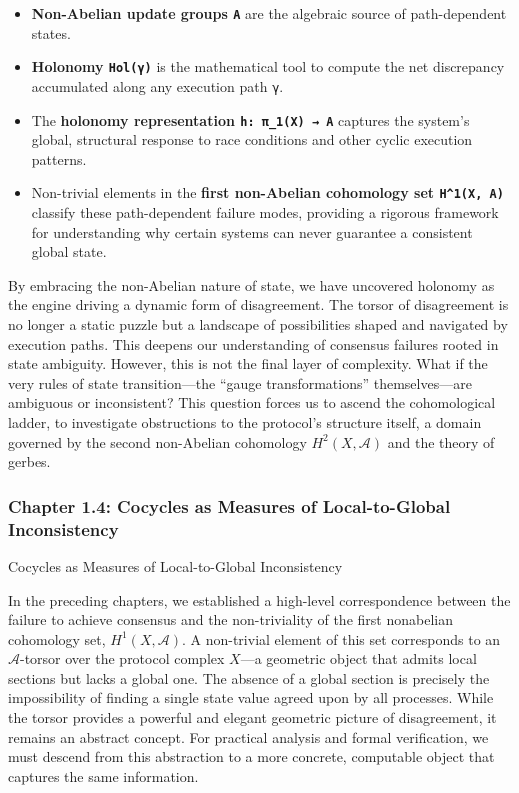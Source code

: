 \documentclass[
]{article}
\providecommand{\tightlist}{%
  \setlength{\itemsep}{0pt}\setlength{\parskip}{0pt}}
\begin{document}
\begin{itemize}
\tightlist
\item
  \textbf{Non-Abelian update groups \texttt{A}} are the algebraic source
  of path-dependent states.
\item
  \textbf{Holonomy \texttt{Hol(γ)}} is the mathematical tool to compute
  the net discrepancy accumulated along any execution path \texttt{γ}.
\item
  The \textbf{holonomy representation \texttt{h:\ π\_1(X)\ →\ A}}
  captures the system's global, structural response to race conditions
  and other cyclic execution patterns.
\item
  Non-trivial elements in the \textbf{first non-Abelian cohomology set
  \texttt{H\^{}1(X,\ A)}} classify these path-dependent failure modes,
  providing a rigorous framework for understanding why certain systems
  can never guarantee a consistent global state.
\end{itemize}

By embracing the non-Abelian nature of state, we have uncovered holonomy
as the engine driving a dynamic form of disagreement. The torsor of
disagreement is no longer a static puzzle but a landscape of
possibilities shaped and navigated by execution paths. This deepens our
understanding of consensus failures rooted in state ambiguity. However,
this is not the final layer of complexity. What if the very rules of
state transition---the ``gauge transformations'' themselves---are
ambiguous or inconsistent? This question forces us to ascend the
cohomological ladder, to investigate obstructions to the protocol's
structure itself, a domain governed by the second non-Abelian cohomology
\(H^2(X, \mathcal{A})\) and the theory of gerbes.

\subsubsection{Chapter 1.4: Cocycles as Measures of Local-to-Global
Inconsistency}\label{chapter-1.4-cocycles-as-measures-of-local-to-global-inconsistency}

\protect{}\label{chapter-1-4-Cocycles_as_Measures_of_Local-to-Global}{}

Cocycles as Measures of Local-to-Global Inconsistency

In the preceding chapters, we established a high-level correspondence
between the failure to achieve consensus and the non-triviality of the
first nonabelian cohomology set, \(H^1(X, \mathcal{A})\). A non-trivial
element of this set corresponds to an \(\mathcal{A}\)-torsor over the
protocol complex \(X\)---a geometric object that admits local sections
but lacks a global one. The absence of a global section is precisely the
impossibility of finding a single state value agreed upon by all
processes. While the torsor provides a powerful and elegant geometric
picture of disagreement, it remains an abstract concept. For practical
analysis and formal verification, we must descend from this abstraction
to a more concrete, computable object that captures the same
information.
\end{document}
